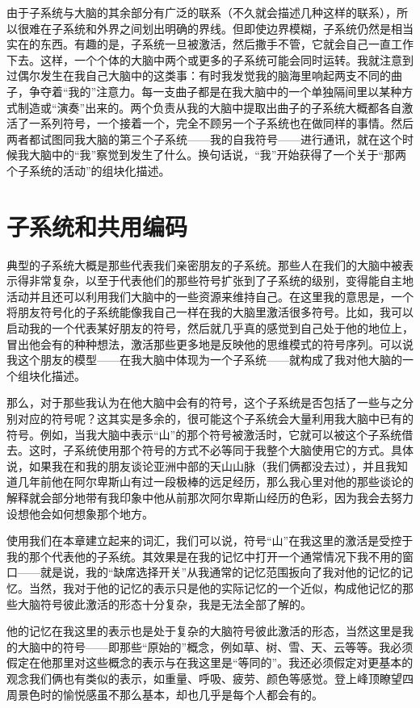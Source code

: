 由于子系统与大脑的其余部分有广泛的联系（不久就会描述几种这样的联系），所以很难在子系统和外界之间划出明确的界线。但即使边界模糊，子系统仍然是相当实在的东西。有趣的是，子系统一旦被激活，然后撒手不管，它就会自己一直工作下去。这样，一个个体的大脑中两个或更多的子系统可能会同时运转。我就注意到过偶尔发生在我自己大脑中的这类事：有时我发觉我的脑海里响起两支不同的曲子，争夺着“我的”注意力。每一支曲子都是在我大脑中的一个单独隔间里以某种方式制造或“演奏”出来的。两个负责从我的大脑中提取出曲子的子系统大概都各自激活了一系列符号，一个接着一个，完全不顾另一个子系统也在做同样的事情。然后两者都试图同我大脑的第三个子系统——我的自我符号——进行通讯，就在这个时候我大脑中的“我”察觉到发生了什么。换句话说，“我”开始获得了一个关于“那两个子系统的活动”的组块化描述。

\section{子系统和共用编码}

典型的子系统大概是那些代表我们亲密朋友的子系统。那些人在我们的大脑中被表示得非常复杂，以至于代表他们的那些符号扩张到了子系统的级别，变得能自主地活动并且还可以利用我们大脑中的一些资源来维持自己。在这里我的意思是，一个将朋友符号化的子系统能像我自己一样在我的大脑里激活很多符号。比如，我可以启动我的一个代表某好朋友的符号，然后就几乎真的感觉到自己处于他的地位上，冒出他会有的种种想法，激活那些更多地是反映他的思维模式的符号序列。可以说我这个朋友的模型——在我大脑中体现为一个子系统——就构成了我对他大脑的一个组块化描述。

那么，对于那些我认为在他大脑中会有的符号，这个子系统是否包括了一些与之分别对应的符号呢？这其实是多余的，很可能这个子系统会大量利用我大脑中已有的符号。例如，当我大脑中表示“山”的那个符号被激活时，它就可以被这个子系统借去。这时，子系统使用那个符号的方式不必等同于我整个大脑使用它的方式。具体说，如果我在和我的朋友谈论亚洲中部的天山山脉（我们俩都没去过），并且我知道几年前他在阿尔卑斯山有过一段极棒的远足经历，那么我心里对他的那些谈论的解释就会部分地带有我印象中他从前那次阿尔卑斯山经历的色彩，因为我会去努力设想他会如何想象那个地方。

使用我们在本章建立起来的词汇，我们可以说，符号“山”在我这里的激活是受控于我的那个代表他的子系统。其效果是在我的记忆中打开一个通常情况下我不用的窗口——就是说，我的“缺席选择开关”从我通常的记忆范围扳向了我对他的记忆的记忆。当然，我对于他的记忆的表示只是他的实际记忆的一个近似，构成他记忆的那些大脑符号彼此激活的形态十分复杂，我是无法全部了解的。

他的记忆在我这里的表示也是处于复杂的大脑符号彼此激活的形态，当然这里是我的大脑中的符号——即那些“原始的”概念，例如草、树、雪、天、云等等。我必须假定在他那里对这些概念的表示与在我这里是“等同的”。我还必须假定对更基本的观念我们俩也有类似的表示，如重量、呼吸、疲劳、颜色等感觉。登上峰顶瞭望四周景色时的愉悦感虽不那么基本，却也几乎是每个人都会有的。

